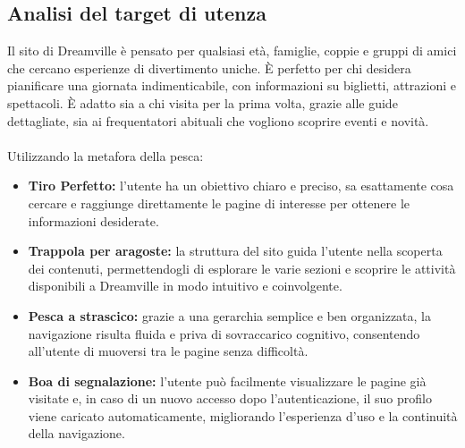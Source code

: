 \subsection{Analisi del target di utenza}
Il sito di Dreamville è pensato per qualsiasi età, famiglie, coppie e gruppi di amici che cercano esperienze di divertimento uniche. È perfetto per chi desidera pianificare una giornata indimenticabile, con informazioni su biglietti, attrazioni e spettacoli. È adatto sia a chi visita per la prima volta, grazie alle guide dettagliate, sia ai frequentatori abituali che vogliono scoprire eventi e novità.
\\ \\
Utilizzando la metafora della pesca:
\begin{itemize}
    \item \textbf{Tiro Perfetto:} l'utente ha un obiettivo chiaro e preciso, sa esattamente cosa cercare e raggiunge direttamente le pagine di interesse per ottenere le informazioni desiderate.
    
    \item \textbf{Trappola per aragoste:} la struttura del sito guida l'utente nella scoperta dei contenuti, permettendogli di esplorare le varie sezioni e scoprire le attività disponibili a Dreamville in modo intuitivo e coinvolgente.
    
    \item \textbf{Pesca a strascico:} grazie a una gerarchia semplice e ben organizzata, la navigazione risulta fluida e priva di sovraccarico cognitivo, consentendo all'utente di muoversi tra le pagine senza difficoltà.
    
    \item \textbf{Boa di segnalazione:} l'utente può facilmente visualizzare le pagine già visitate e, in caso di un nuovo accesso dopo l'autenticazione, il suo profilo viene caricato automaticamente, migliorando l’esperienza d’uso e la continuità della navigazione.
\end{itemize}